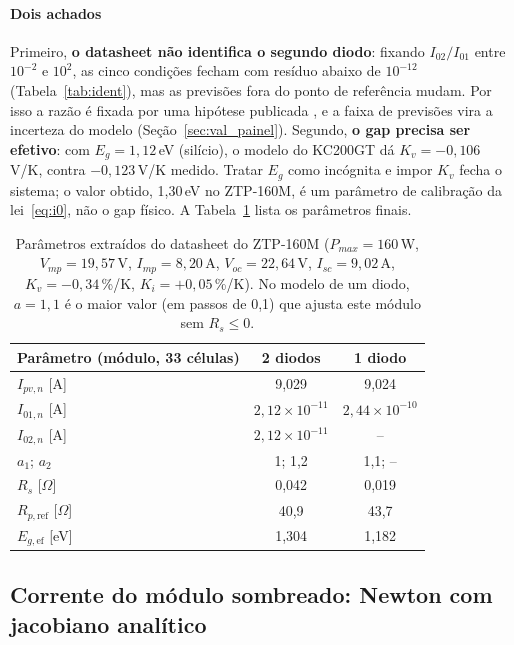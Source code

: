 \documentclass[3p,authoryear]{elsarticle}
\begin{document}
\paragraph{Dois achados} Primeiro, \textbf{o datasheet não identifica o segundo diodo}:
fixando $I_{02}/I_{01}$ entre $10^{-2}$ e $10^{2}$, as cinco condições fecham com resíduo
abaixo de $10^{-12}$ (Tabela~\ref{tab:ident}), mas as previsões fora do ponto de referência
mudam. Por isso a razão é fixada por uma hipótese publicada \citep{ishaque}, e a faixa de
previsões vira a incerteza do modelo (Seção~\ref{sec:val_painel}). Segundo, \textbf{o gap
precisa ser efetivo}: com $E_g = 1{,}12$\,eV (silício), o modelo do KC200GT dá
$K_v = -0{,}106$\,V/K, contra $-0{,}123$\,V/K medido. Tratar $E_g$ como incógnita e impor
$K_v$ fecha o sistema; o valor obtido, 1,30\,eV no ZTP-160M, é um parâmetro de calibração da
lei~\eqref{eq:i0}, não o gap físico. A Tabela~\ref{tab:params} lista os parâmetros finais.

\begin{table}[!htbp]
\centering\small
\begin{tabular}{lcc}
\toprule
Parâmetro (módulo, 33 células) & 2 diodos & 1 diodo \\
\midrule
$I_{pv,n}$ [A] & 9,029 & 9,024 \\
$I_{01,n}$ [A] & $2{,}12\times10^{-11}$ & $2{,}44\times10^{-10}$ \\
$I_{02,n}$ [A] & $2{,}12\times10^{-11}$ & -- \\
$a_1$; $a_2$ & 1; 1,2 & 1,1; -- \\
$R_s$ [$\Omega$] & 0,042 & 0,019 \\
$R_{p,\mathrm{ref}}$ [$\Omega$] & 40,9 & 43,7 \\
$E_{g,\mathrm{ef}}$ [eV] & 1,304 & 1,182 \\
\bottomrule
\end{tabular}
\caption{Parâmetros extraídos do datasheet do ZTP-160M ($P_{max} = 160$\,W,
$V_{mp} = 19{,}57$\,V, $I_{mp} = 8{,}20$\,A, $V_{oc} = 22{,}64$\,V, $I_{sc} = 9{,}02$\,A,
$K_v = -0{,}34$\,\%/K, $K_i = +0{,}05$\,\%/K). No modelo de um diodo, $a = 1{,}1$ é o maior
valor (em passos de 0,1) que ajusta este módulo sem $R_s \le 0$.}
\label{tab:params}
\end{table}

\subsection{Corrente do módulo sombreado: Newton com jacobiano analítico}
\end{document}
